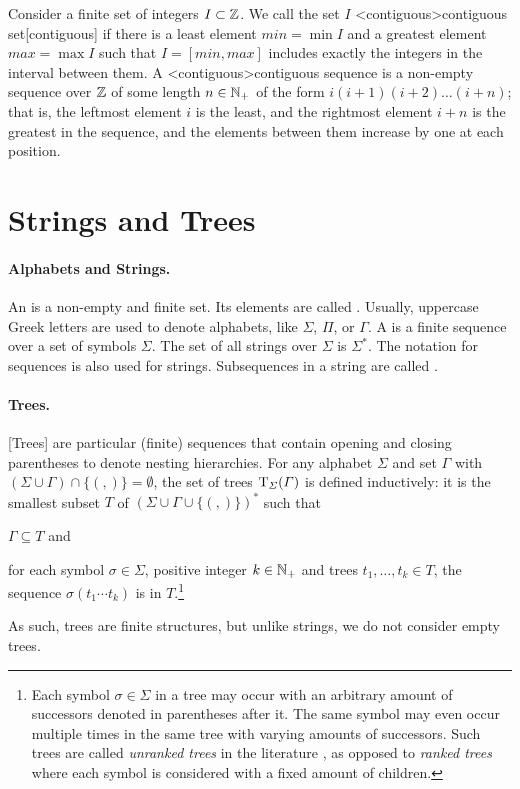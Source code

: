 \documentclass[../document.tex]{subfiles}
\begin{document}
    Consider a finite set of integers \(I \subset \mathbb{Z}\).
    We call the set \(I\) <contiguous>{contiguous set}[contiguous] if there is a least element \(\mathit{min} = \min I\) and a greatest element \(\mathit{max} = \max I\) such that \(I = [\mathit{min}, \mathit{max}]\) includes exactly the integers in the interval between them.
    A <contiguous>{contiguous sequence} is a non-empty sequence over \(\mathbb{Z}\) of some length \(n \in \mathbb{N}_+\) of the form \(i (i+1) (i+2) \ldots (i+n)\); that is, the leftmost element \(i\) is the least, and the rightmost element \(i+n\) is the greatest in the sequence, and the elements between them increase by one at each position.

    \section{Strings and Trees}\label{sec:preliminaries:trees}
    \paragraph{Alphabets and Strings.}
    An  is a non-empty and finite set. Its elements are called .
    Usually, uppercase Greek letters are used to denote alphabets, like \(\varSigma\), \(\varPi\), or \(\varGamma\).
    A  is a finite sequence over a set of symbols \(\varSigma\).
    The set of all strings over \(\varSigma\) is \(\varSigma^*\).
    The notation for sequences is also used for strings.
    Subsequences in a string are called .

    \paragraph{Trees.}
    [Trees] are particular (finite) sequences that contain opening and closing parentheses to denote nesting hierarchies.
    For any alphabet \(\varSigma\) and set \(\varGamma\) with \((\varSigma \cup \varGamma) \cap \{(,)\} = \emptyset\), the set of trees \(\operatorname{T}_\varSigma(\varGamma)\) is defined inductively: it is the smallest subset \(T\) of \((\varSigma \cup \varGamma \cup \{ (, )\})^*\) such that
    \begin{inparaenum}
        \item \(\varGamma \subseteq T\) and
        \item for each symbol \(\sigma \in \varSigma\), positive integer \(k \in \mathbb{N}_+\) and trees \(t_1, \ldots, t_k \in T\), the sequence \(\sigma(t_1 \cdots t_k)\) is in \(T\).\footnote{
            Each symbol \(\sigma \in \varSigma\) in a tree may occur with an arbitrary amount of successors denoted in parentheses after it.
            The same symbol may even occur multiple times in the same tree with varying amounts of successors.
            Such trees are called \emph{unranked trees} in the literature \citep[cf.\@][Sec.\@ 8.2]{Comon08}, as opposed to \emph{ranked trees} where each symbol is considered with a fixed amount of children.
        }
    \end{inparaenum}
    As such, trees are finite structures, but unlike strings, we do not consider empty trees.
\end{document}
